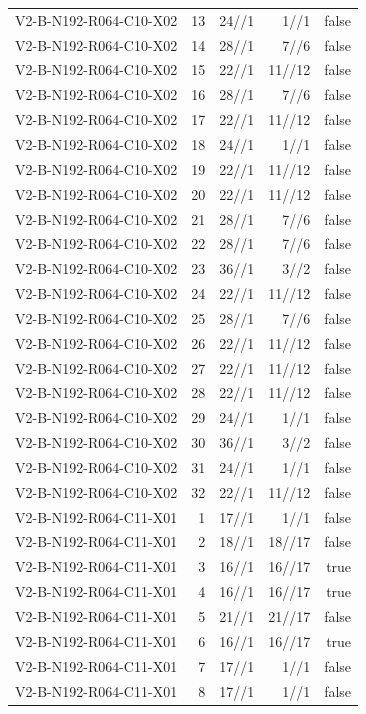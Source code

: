 {\begin{longtable}{lrrrr}
V2-B-N192-R064-C10-X02 & 13 & 24//1 & 1//1 & false \\
V2-B-N192-R064-C10-X02 & 14 & 28//1 & 7//6 & false \\
V2-B-N192-R064-C10-X02 & 15 & 22//1 & 11//12 & false \\
V2-B-N192-R064-C10-X02 & 16 & 28//1 & 7//6 & false \\
V2-B-N192-R064-C10-X02 & 17 & 22//1 & 11//12 & false \\
V2-B-N192-R064-C10-X02 & 18 & 24//1 & 1//1 & false \\
V2-B-N192-R064-C10-X02 & 19 & 22//1 & 11//12 & false \\
V2-B-N192-R064-C10-X02 & 20 & 22//1 & 11//12 & false \\
V2-B-N192-R064-C10-X02 & 21 & 28//1 & 7//6 & false \\
V2-B-N192-R064-C10-X02 & 22 & 28//1 & 7//6 & false \\
V2-B-N192-R064-C10-X02 & 23 & 36//1 & 3//2 & false \\
V2-B-N192-R064-C10-X02 & 24 & 22//1 & 11//12 & false \\
V2-B-N192-R064-C10-X02 & 25 & 28//1 & 7//6 & false \\
V2-B-N192-R064-C10-X02 & 26 & 22//1 & 11//12 & false \\
V2-B-N192-R064-C10-X02 & 27 & 22//1 & 11//12 & false \\
V2-B-N192-R064-C10-X02 & 28 & 22//1 & 11//12 & false \\
V2-B-N192-R064-C10-X02 & 29 & 24//1 & 1//1 & false \\
V2-B-N192-R064-C10-X02 & 30 & 36//1 & 3//2 & false \\
V2-B-N192-R064-C10-X02 & 31 & 24//1 & 1//1 & false \\
V2-B-N192-R064-C10-X02 & 32 & 22//1 & 11//12 & false \\
V2-B-N192-R064-C11-X01 & 1 & 17//1 & 1//1 & false \\
V2-B-N192-R064-C11-X01 & 2 & 18//1 & 18//17 & false \\
V2-B-N192-R064-C11-X01 & 3 & 16//1 & 16//17 & true \\
V2-B-N192-R064-C11-X01 & 4 & 16//1 & 16//17 & true \\
V2-B-N192-R064-C11-X01 & 5 & 21//1 & 21//17 & false \\
V2-B-N192-R064-C11-X01 & 6 & 16//1 & 16//17 & true \\
V2-B-N192-R064-C11-X01 & 7 & 17//1 & 1//1 & false \\
V2-B-N192-R064-C11-X01 & 8 & 17//1 & 1//1 & false \\

\end{longtable}}
